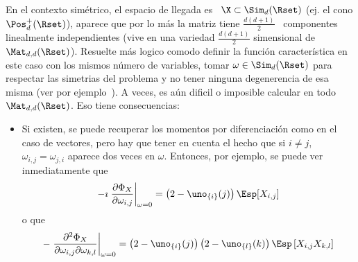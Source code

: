 En  el  contexto  sim\'etrico, \ie  el  espacio  de  llegada  es \  $\X  \subset
\Sim_d(\Rset)$ (ej.   el cono  $\Pos_d^+(\Rset)$), aparece que  por lo  m\'as la
matriz tiene $\frac{d (d+1)}{2}$  \ componentes linealmente independientes (vive
en  una  variedad   $\frac{d  (d+1)}{2}$  simensional  de  $\Mat_{d,d}(\Rset)$).
Resuelte m\'as logico comodo definir  la funci\'on caracter\'istica en este caso
con los mismos n\'umero de  variables, \ie tomar $\omega \in \Sim_d(\Rset)$ para
respectar  las simetrias del  problema y  no tener  ninguna degenerencia  de esa
misma (ver  por ejemplo~\cite{PedRic91,  And03}).  A veces,  es a\'un  dificil o
imposible calcular en todo \ $\Mat_{d,d}(\Rset)$. Eso tiene consecuencias:
%
\begin{itemize}
\item Si existen,  se puede recuperar los momentos  por diferenciaci\'on como en
  el caso de  vectores, pero hay que tener  en cuenta el hecho  que  si $i \ne
  j$, $\omega_{i,j} = \omega_{j,i}$ aparece dos veces en $\omega$. Entonces, por
  ejemplo, se puede ver inmediatamente que
  \[
  -\imath \left. \frac{\partial \Phi_X}{\partial \omega_{i,j}} \right|_{\omega =
    0} = \left( 2 - \uno_{\{i\}}(j) \right) \Esp[X_{i,j}]
  \]
  o que
  \[
  - \left. \frac{\partial^2 \Phi_X}{\partial \omega_{i,j} \partial \omega_{k,l}}
  \right|_{\omega  =  0}  =  \left(  2  -  \uno_{\{i\}}(j)  \right)  \left(  2  -
    \uno_{\{l\}}(k) \right) \Esp\left[ X_{i,j} X_{k,l} \right]
  \]
\end{itemize}
